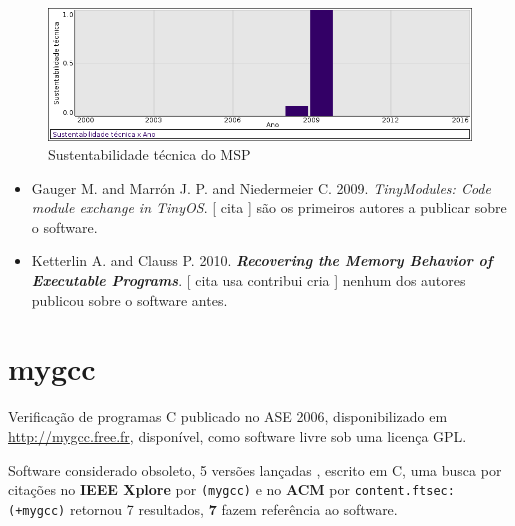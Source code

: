 \begin{figure}[h]
  \center
  \includegraphics[scale=0.50]{result-documents/charts/msp.png}
  \caption{Sustentabilidade técnica do MSP}
\end{figure}


\begin{itemize}
\item Gauger M. and Marrón J. P. and Niedermeier C.
      2009.
        \textit{ TinyModules: Code module exchange in TinyOS}.
      [
          cita
      ]
são os primeiros autores a publicar sobre o software.
\item Ketterlin A. and Clauss P.
      2010.
        \textbf{\textit{ Recovering the Memory Behavior of Executable Programs}}.
      [
          cita
          usa
          contribui
          cria
      ]
nenhum dos autores publicou sobre o software antes.
\end{itemize}
\section{mygcc}

Verificação de programas C
publicado no ASE 2006,
disponibilizado em \url{http://mygcc.free.fr},
disponível,
como software livre
sob uma licença GPL.

Software considerado obsoleto,
5 versões lançadas
,
escrito em C,
uma busca por citações no {\bf IEEE Xplore} por
\texttt{(mygcc)}
e no {\bf ACM} por
\texttt{content.ftsec:(+mygcc)}
retornou
7 resultados,
{\bf 7} fazem referência ao software.


